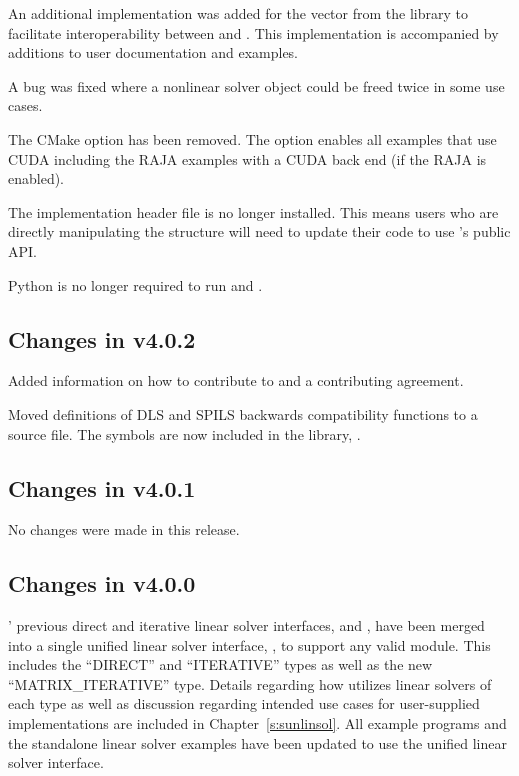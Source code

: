 An additional {\nvector} implementation was added for the
{\tpetra} vector from the {\trilinos} library to facilitate interoperability
between {\sundials} and {\trilinos}. This implementation is accompanied by
additions to user documentation and {\sundials} examples.

A bug was fixed where a nonlinear solver object could be freed twice in some use
cases.

The  CMake option has been removed. The option 
enables all examples that use CUDA including the RAJA examples with a CUDA back end (if the RAJA
{\nvector} is enabled).

The implementation header file  is no longer installed. This means users
who are directly manipulating the  structure will need to update their code
to use {\cvodes}'s public API.

Python is no longer required to run  and .

\subsection*{Changes in v4.0.2}

Added information on how to contribute to {\sundials} and a contributing agreement.

Moved definitions of DLS and SPILS backwards compatibility functions to a source file.
The symbols are now included in the {\cvodes} library, .

\subsection*{Changes in v4.0.1}

No changes were made in this release.

\subsection*{Changes in v4.0.0}

{\cvodes}' previous direct and iterative linear solver interfaces,
{\cvdls} and {\cvspils}, have been merged into a single unified linear
solver interface, {\cvls}, to support any valid {\sunlinsol} module.
This includes the ``DIRECT'' and ``ITERATIVE'' types as well as the new
``MATRIX\_ITERATIVE'' type. Details regarding how {\cvls} utilizes linear
solvers of each type as well as discussion regarding intended use cases for
user-supplied {\sunlinsol} implementations are included in
Chapter~\ref{s:sunlinsol}. All {\cvodes} example programs and the standalone
linear solver examples have been updated to use the unified linear solver
interface.

